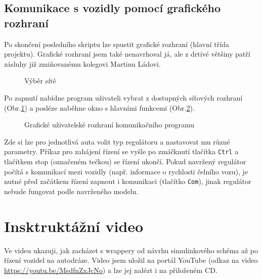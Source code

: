 \documentclass[thesis=M,czech,hidelinks]{FITthesis}[2012/06/26]
\begin{document}
\subsection{Komunikace s vozidly pomocí grafického rozhraní}
Po skončení posledního skriptu lze spustit grafické rozhraní (hlavní třída projektu). Grafické rozhraní jsem také nenavrhoval já, ale z drtivé většiny patří zásluhy již zmiňovanému kolegovi Martinu Ládovi.
\begin{figure}[h]
        \centering
        \caption{Výběr sítě}
        \label{fig:tutwifi}
\end{figure}

Po zapnutí nabídne program uživateli vybrat z dostupných síťových rozhraní (Obr.\ref{fig:tutwifi}) a posléze naběhne okno s hlavními funkcemi (Obr.\ref{fig:tutgui}).
\begin{figure}[h]
        \centering
        \caption{Grafické uživatelské rozhraní komunikačního programu}
        \label{fig:tutgui}
\end{figure}

Zde si lze pro jednotlivá auta volit typ regulátoru a nastavovat mu různé parametry. Příkaz pro zahájení řízení se vyšle po zmáčknutí tlačítka \texttt{Ctrl} a tlačítkem stop (označeném tečkou) se řízení ukončí. Pokud navržený regulátor počítá s komunikací mezi vozidly (např. informace o rychlosti čelního vozu), je nutné před začátkem řízení zapnout i komunikaci (tlačítko \texttt{Com}), jinak regulátor nebude fungovat podle navrženého modelu.
\section{Insktruktážní video}
Ve videu ukazuji, jak zacházet s wrappery od návrhu simulinkového schéma až po řízení vozidel na autodráze. Video jsem uložil na portál YouTube (odkaz na video \url{https://youtu.be/MsdfnZxJcNo}) a lze jej nalézt i na přiloženém CD.
\end{document}
